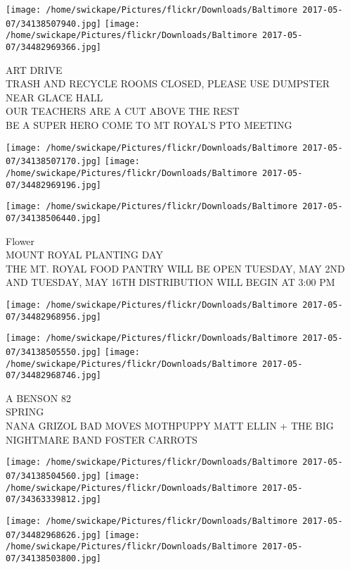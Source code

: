 \documentclass[10pt,letterpaper]{article}
\begin{document}
\texttt{[image: /home/swickape/Pictures/flickr/Downloads/Baltimore 2017-05-07/34138507940.jpg]}
\texttt{[image: /home/swickape/Pictures/flickr/Downloads/Baltimore 2017-05-07/34482969366.jpg]}

ART DRIVE\\
TRASH AND RECYCLE ROOMS CLOSED, PLEASE USE DUMPSTER NEAR GLACE HALL\\
OUR TEACHERS ARE A CUT ABOVE THE REST\\
BE A SUPER HERO COME TO MT ROYAL'S PTO MEETING\\
\pagebreak

\texttt{[image: /home/swickape/Pictures/flickr/Downloads/Baltimore 2017-05-07/34138507170.jpg]}
\texttt{[image: /home/swickape/Pictures/flickr/Downloads/Baltimore 2017-05-07/34482969196.jpg]}

\texttt{[image: /home/swickape/Pictures/flickr/Downloads/Baltimore 2017-05-07/34138506440.jpg]}

Flower\\
MOUNT ROYAL PLANTING DAY\\
THE MT. ROYAL FOOD PANTRY WILL BE OPEN TUESDAY, MAY 2ND AND TUESDAY, MAY 16TH DISTRIBUTION WILL BEGIN AT 3:00 PM\\
\pagebreak

\texttt{[image: /home/swickape/Pictures/flickr/Downloads/Baltimore 2017-05-07/34482968956.jpg]}

\vspace{0.25in}
\texttt{[image: /home/swickape/Pictures/flickr/Downloads/Baltimore 2017-05-07/34138505550.jpg]}
\texttt{[image: /home/swickape/Pictures/flickr/Downloads/Baltimore 2017-05-07/34482968746.jpg]}

A BENSON 82\\
SPRING\\
NANA GRIZOL BAD MOVES MOTHPUPPY MATT ELLIN + THE BIG NIGHTMARE BAND FOSTER CARROTS\\
\pagebreak

\texttt{[image: /home/swickape/Pictures/flickr/Downloads/Baltimore 2017-05-07/34138504560.jpg]}
\texttt{[image: /home/swickape/Pictures/flickr/Downloads/Baltimore 2017-05-07/34363339812.jpg]}

\texttt{[image: /home/swickape/Pictures/flickr/Downloads/Baltimore 2017-05-07/34482968626.jpg]}
\texttt{[image: /home/swickape/Pictures/flickr/Downloads/Baltimore 2017-05-07/34138503800.jpg]}
\end{document}
